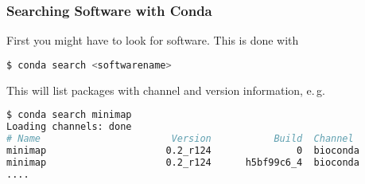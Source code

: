\begin{frame}[fragile]
  \frametitle{Searching Software with Conda}
  First you might have to look for software. This is done with
  \begin{lstlisting}[language=Bash, style=Shell]
$ conda search <softwarename>
  \end{lstlisting}
  \pause
  \pause
  This will list packages with channel and version information, e.\,g.
  \begin{lstlisting}[language=Bash, style=Shell, basicstyle=\tiny]
$ conda search minimap
Loading channels: done
# Name                       Version           Build  Channel             
minimap                     0.2_r124               0  bioconda            
minimap                     0.2_r124      h5bf99c6_4  bioconda
....
  \end{lstlisting}
\end{frame}
